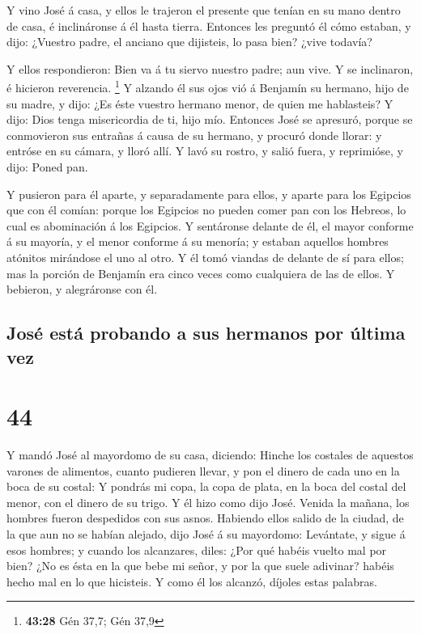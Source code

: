  Y vino José á casa, y ellos le trajeron el presente que
tenían en su mano dentro de casa, é inclináronse á él hasta tierra.
 Entonces les preguntó él cómo estaban, y dijo: ¿Vuestro
padre, el anciano que dijisteis, lo pasa bien? ¿vive todavía?

 Y ellos respondieron: Bien va á tu siervo nuestro padre;
aun vive. Y se inclinaron, é hicieron reverencia. \footnote{\textbf{43:28}
  Gén 37,7; Gén 37,9}  Y alzando él sus ojos vió á
Benjamín su hermano, hijo de su madre, y dijo: ¿Es éste vuestro hermano
menor, de quien me hablasteis? Y dijo: Dios tenga misericordia de ti,
hijo mío.  Entonces José se apresuró, porque se
conmovieron sus entrañas á causa de su hermano, y procuró donde llorar:
y entróse en su cámara, y lloró allí.  Y lavó su rostro,
y salió fuera, y reprimióse, y dijo: Poned pan.

 Y pusieron para él aparte, y separadamente para ellos, y
aparte para los Egipcios que con él comían: porque los Egipcios no
pueden comer pan con los Hebreos, lo cual es abominación á los Egipcios.
 Y sentáronse delante de él, el mayor conforme á su
mayoría, y el menor conforme á su menoría; y estaban aquellos hombres
atónitos mirándose el uno al otro.  Y él tomó viandas de
delante de sí para ellos; mas la porción de Benjamín era cinco veces
como cualquiera de las de ellos. Y bebieron, y alegráronse con él.

\hypertarget{josuxe9-estuxe1-probando-a-sus-hermanos-por-uxfaltima-vez}{%
\subsection{José está probando a sus hermanos por última
vez}\label{josuxe9-estuxe1-probando-a-sus-hermanos-por-uxfaltima-vez}}

\hypertarget{section-43}{%
\section{44}\label{section-43}}

 Y mandó José al mayordomo de su casa, diciendo: Hinche
los costales de aquestos varones de alimentos, cuanto pudieren llevar, y
pon el dinero de cada uno en la boca de su costal:  Y
pondrás mi copa, la copa de plata, en la boca del costal del menor, con
el dinero de su trigo. Y él hizo como dijo José.  Venida
la mañana, los hombres fueron despedidos con sus asnos. 
Habiendo ellos salido de la ciudad, de la que aun no se habían alejado,
dijo José á su mayordomo: Levántate, y sigue á esos hombres; y cuando
los alcanzares, diles: ¿Por qué habéis vuelto mal por bien?
 ¿No es ésta en la que bebe mi señor, y por la que suele
adivinar? habéis hecho mal en lo que hicisteis.  Y como él
los alcanzó, díjoles estas palabras.

